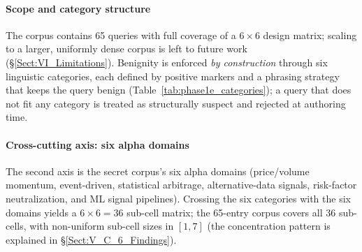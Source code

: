 \documentclass[journal]{IEEEtran}
\begin{document}
\paragraph{Scope and category structure}
The corpus contains 65 queries with full coverage of a $6 \times 6$ design matrix; scaling to a larger, uniformly dense corpus is left to future work (\S\ref{Sect:VI_Limitations}). Benignity is enforced \emph{by construction} through six linguistic categories, each defined by positive markers and a phrasing strategy that keeps the query benign (Table~\ref{tab:phase1e_categories}); a query that does not fit any category is treated as structurally suspect and rejected at authoring time.

\begin{table}[!t]
    \centering
    \caption{Six linguistic categories defining benign hard-negative construction. Each category has positive markers (vocabulary signals) and an associated linguistic strategy that maintains benign-by-construction discipline.}
    \label{tab:phase1e_categories}
\end{table}

\paragraph{Cross-cutting axis: six alpha domains}
The second axis is the secret corpus's six alpha domains (price/volume momentum, event-driven, statistical arbitrage, alternative-data signals, risk-factor neutralization, and ML signal pipelines). Crossing the six categories with the six domains yields a $6 \times 6 = 36$ sub-cell matrix; the 65-entry corpus covers all 36 sub-cells, with non-uniform sub-cell sizes in $[1, 7]$ (the concentration pattern is explained in \S\ref{Sect:V_C_6_Findings}).
\end{document}
